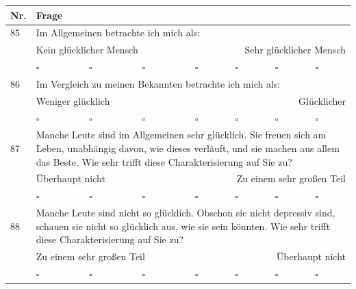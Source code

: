 \begin{flushleft}
\begin{longtable}[c]{ |p{1em} | p{4em} p{4em} p{4em} p{4em} p{4em} p{4em} p{4em}|} 
  \hline
  Nr. & \multicolumn{7}{|l|}{Frage} \\
  \hline
  \endfirsthead
  
  \hline
  \endhead
 
  \hline
  \endfoot
  
  \hline
  \endlastfoot
  
  85 & \multicolumn{7}{l|}{Im Allgemeinen betrachte ich mich als:}\\
  & \multicolumn{3}{l}{Kein glücklicher Mensch} & \multicolumn{4}{r|}{Sehr glücklicher Mensch}\\
  &$\square$&$\square$&$\square$&$\square$&$\square$&$\square$&$\square$\\
  
  86 & \multicolumn{7}{l|}{Im Vergleich zu meinen Bekannten betrachte ich mich als:}\\
  & \multicolumn{3}{l}{Weniger glücklich} & \multicolumn{4}{r|}{Glücklicher}\\
  &$\square$&$\square$&$\square$&$\square$&$\square$&$\square$&$\square$\\
  
  87 & \multicolumn{7}{l|}{\begin{minipage}{5.5in}Manche Leute sind im Allgemeinen sehr glücklich. Sie freuen sich am Leben, unabhängig davon, wie dieses verläuft, und sie machen aus allem das Beste. Wie sehr trifft diese Charakterisierung auf Sie zu?\end{minipage}}\\
  & \multicolumn{3}{l}{Überhaupt nicht} & \multicolumn{4}{r|}{Zu einem sehr großen Teil}\\
  &$\square$&$\square$&$\square$&$\square$&$\square$&$\square$&$\square$\\
  
  88 & \multicolumn{7}{l|}{\begin{minipage}{5.5in}Manche Leute sind nicht so glücklich. Obschon sie nicht depressiv sind, schauen sie nicht so glücklich aus, wie sie sein könnten. Wie sehr trifft diese Charakterisierung auf Sie zu?\end{minipage}}\\
  & \multicolumn{3}{l}{Zu einem sehr großen Teil} & \multicolumn{4}{r|}{Überhaupt nicht}\\
  &$\square$&$\square$&$\square$&$\square$&$\square$&$\square$&$\square$\\
  

\end{longtable}
\end{flushleft}
